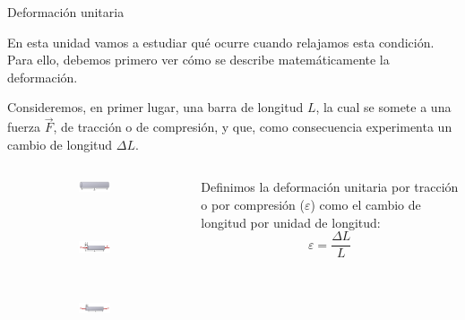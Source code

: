 \documentclass[11pt,handout,aspectratio=1610]{beamer}
\newcommand{\vs}{\vspace{11pt}}
\begin{document}
\begin{frame}{Deformación unitaria}

    En esta unidad vamos a estudiar qué ocurre cuando relajamos esta condición. Para ello, debemos primero ver cómo se describe matemáticamente la deformación.

    \vs

    Consideremos, en primer lugar, una barra de longitud $L$, la cual se somete a una fuerza $\vec{F}$, de tracción o de compresión, y que, como consecuencia experimenta un cambio de longitud $\Delta L$.

    \begin{columns}
        \begin{column}{0.5\textwidth}
            \begin{figure}
                \centering
                \begin{subfigure}{\textwidth}
                    \centering
                    \includegraphics{../figs/mechanics_stress-7.pdf}
                \end{subfigure}
                \\
                \begin{subfigure}{\textwidth}
                    \centering
                    \includegraphics{../figs/mechanics_stress-8.pdf}
                \end{subfigure}
                \\
                \begin{subfigure}{\textwidth}
                    \centering
                    \includegraphics{../figs/mechanics_stress-9.pdf}
                \end{subfigure}
            \end{figure}
        \end{column}
        \begin{column}{0.5\textwidth}
            Definimos la deformación unitaria por tracción o por compresión ($\varepsilon$) como el cambio de longitud por unidad de longitud: $$ \varepsilon = \frac{\Delta L}{L} $$
        \end{column}
    \end{columns}

\end{frame}
\end{document}
